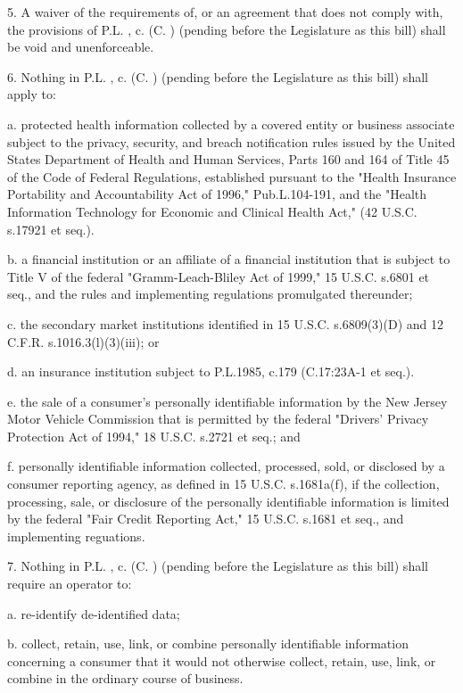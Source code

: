  

     5.    A waiver of the requirements of, or an agreement that does not comply with, the provisions of P.L.    , c.    (C.      ) (pending before the Legislature as this bill) shall be void and unenforceable.

 

     6.    Nothing in P.L.    , c.    (C.      ) (pending before the Legislature as this bill) shall apply to:

     a.     protected health information collected by a covered entity or business associate subject to the privacy, security, and breach notification rules issued by the United States Department of Health and Human Services, Parts 160 and 164 of Title 45 of the Code of Federal Regulations, established pursuant to the "Health Insurance Portability and Accountability Act of 1996," Pub.L.104-191, and the "Health Information Technology for Economic and Clinical Health Act," (42 U.S.C. s.17921 et seq.).

     b.    a financial institution or an affiliate of a financial institution that is subject to Title V of the federal "Gramm-Leach-Bliley Act of 1999," 15 U.S.C. s.6801 et seq., and the rules and implementing regulations promulgated thereunder; 

     c.     the secondary market institutions identified in 15 U.S.C. s.6809(3)(D) and 12 C.F.R. s.1016.3(l)(3)(iii); or

     d.    an insurance institution subject to P.L.1985, c.179 (C.17:23A-1 et seq.).

     e.     the sale of a consumer's personally identifiable information by the New Jersey Motor Vehicle Commission that is permitted by the federal "Drivers' Privacy Protection Act of 1994," 18 U.S.C. s.2721 et seq.; and

     f.     personally identifiable information collected, processed, sold, or disclosed by a consumer reporting agency, as defined in 15 U.S.C. s.1681a(f), if the collection, processing, sale, or disclosure of the personally identifiable information is limited by the federal "Fair Credit Reporting Act," 15 U.S.C. s.1681 et seq., and implementing reguations.

 

     7.    Nothing in P.L.    , c.    (C.      ) (pending before the Legislature as this bill) shall require an operator to:

     a.     re-identify de-identified data;

     b.    collect, retain, use, link, or combine personally identifiable information concerning a consumer that it would not otherwise collect, retain, use, link, or combine in the ordinary course of business.

